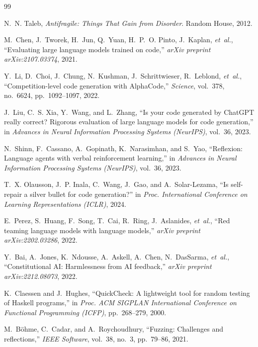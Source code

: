 \documentclass[11pt,letterpaper]{article}
\begin{document}
\begin{thebibliography}{99}

N.~N. Taleb,
\textit{Antifragile: Things That Gain from Disorder}.
Random House, 2012.

M.~Chen, J.~Tworek, H.~Jun, Q.~Yuan, H.~P.~O. Pinto, J.~Kaplan,
\textit{et~al.},
``Evaluating large language models trained on code,''
\textit{arXiv preprint arXiv:2107.03374}, 2021.

Y.~Li, D.~Choi, J.~Chung, N.~Kushman, J.~Schrittwieser, R.~Leblond,
\textit{et~al.},
``Competition-level code generation with AlphaCode,''
\textit{Science}, vol.~378, no.~6624, pp.~1092--1097, 2022.

J.~Liu, C.~S. Xia, Y.~Wang, and L.~Zhang,
``Is your code generated by ChatGPT really correct? Rigorous evaluation
of large language models for code generation,''
in \textit{Advances in Neural Information Processing Systems (NeurIPS)},
vol.~36, 2023.

N.~Shinn, F.~Cassano, A.~Gopinath, K.~Narasimhan, and S.~Yao,
``Reflexion: Language agents with verbal reinforcement learning,''
in \textit{Advances in Neural Information Processing Systems (NeurIPS)},
vol.~36, 2023.

T.~X. Olausson, J.~P. Inala, C.~Wang, J.~Gao, and A.~Solar-Lezama,
``Is self-repair a silver bullet for code generation?''
in \textit{Proc. International Conference on Learning Representations (ICLR)},
2024.

E.~Perez, S.~Huang, F.~Song, T.~Cai, R.~Ring, J.~Aslanides,
\textit{et~al.},
``Red teaming language models with language models,''
\textit{arXiv preprint arXiv:2202.03286}, 2022.

Y.~Bai, A.~Jones, K.~Ndousse, A.~Askell, A.~Chen, N.~DasSarma,
\textit{et~al.},
``Constitutional AI: Harmlessness from AI feedback,''
\textit{arXiv preprint arXiv:2212.08073}, 2022.

K.~Claessen and J.~Hughes,
``QuickCheck: A lightweight tool for random testing of Haskell programs,''
in \textit{Proc. ACM SIGPLAN International Conference on Functional
Programming (ICFP)}, pp.~268--279, 2000.

M.~B\"{o}hme, C.~Cadar, and A.~Roychoudhury,
``Fuzzing: Challenges and reflections,''
\textit{IEEE Software}, vol.~38, no.~3, pp.~79--86, 2021.


\end{thebibliography}
\end{document}
